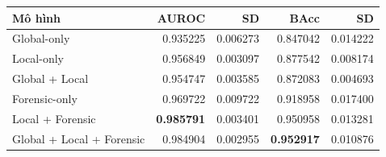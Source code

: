 \small
\begin{tabular}{lrrrr}
\toprule
Mô hình & AUROC & SD & BAcc & SD \\
\midrule
Global-only & 0.935225 & 0.006273 & 0.847042 & 0.014222 \\
Local-only & 0.956849 & 0.003097 & 0.877542 & 0.008174 \\
Global + Local & 0.954747 & 0.003585 & 0.872083 & 0.004693 \\
Forensic-only & 0.969722 & 0.009722 & 0.918958 & 0.017400 \\
Local + Forensic & \textbf{0.985791} & 0.003401 & 0.950958 & 0.013281 \\
Global + Local + Forensic & 0.984904 & 0.002955 & \textbf{0.952917} & 0.010876 \\
\bottomrule
\end{tabular}
